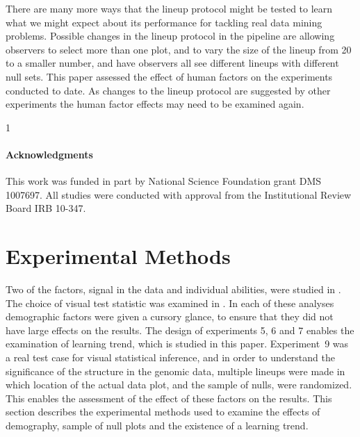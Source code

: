 \documentclass[10pt]{article}\usepackage[]{graphicx}\usepackage[]{xcolor}
\newcommand{\blindDoc}{1}
\begin{document}
There are many more ways that the lineup protocol might be tested to learn what we might expect about its performance for tackling real data mining problems. Possible changes in the lineup protocol in the pipeline are allowing observers to select more than one plot, and to vary the size of the lineup from 20 to a smaller number, and have observers all see different lineups with different null sets.  This paper assessed the effect of human factors on the experiments conducted to date. As changes to the lineup protocol are suggested by other experiments the human factor effects may need to be examined again.


\blindDoc
{
\paragraph{Acknowledgments}
This work was funded in part by National Science Foundation grant DMS 1007697. All studies were conducted with approval from the Institutional Review Board IRB 10-347.
} \fi








\appendix


\section{Experimental Methods}\label{sec:exp_design}

Two of the factors, signal in the data and individual abilities, were studied in \cite{majumder:2013}. The choice of visual test statistic was examined in \cite{heike:2012}. In each of these analyses demographic factors were given a cursory glance, to ensure that they did not have large effects on the results. The design of experiments 5, 6 and 7 enables the examination of learning trend, which is studied in this paper. Experiment~9 was a real test case for visual statistical inference, and in order to understand the significance of the structure in the genomic data, multiple lineups were made in which location of the actual data plot, and the sample of nulls, were randomized. This enables the assessment of the effect of these factors on the results. This section describes the experimental methods used to examine the effects of demography, sample of null plots and the existence of a learning trend. 
\end{document}
